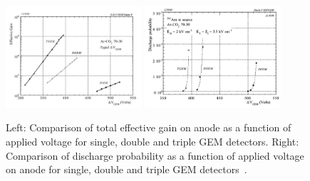 \begin{figure}[!htbp]
    \centering
    \includegraphics[width=0.45\textwidth]{figures/GEM/Comp_threeGEMS_Gain.png}%
    \includegraphics[width=0.45\textwidth]{figures/GEM/Comp_threeGEMS_DischargeProbability.png}
    \caption{Left: Comparison of total effective gain on anode as a function of applied voltage for single, double and triple GEM detectors. Right: Comparison of discharge probability as a function of applied voltage on anode for single, double and triple GEM detectors~\cite{Bachmann2002}.}
    \label{fig:tripleGEM_discharge_gain}
\end{figure}

